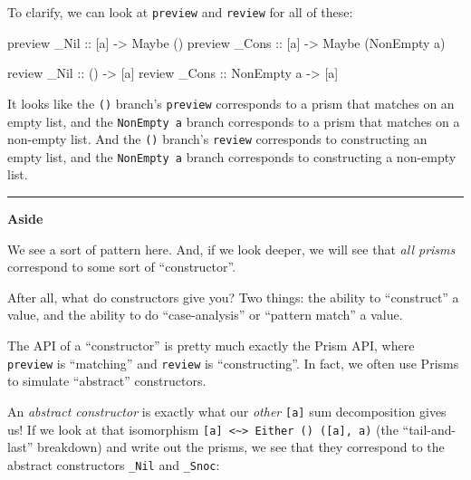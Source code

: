 \documentclass[]{article}
\newenvironment{Shaded}{}{}
\newcommand{\DataTypeTok}[1]{\textcolor[rgb]{0.56,0.13,0.00}{#1}}
\newcommand{\NormalTok}[1]{#1}
\newcommand{\OtherTok}[1]{\textcolor[rgb]{0.00,0.44,0.13}{#1}}
\begin{document}
To clarify, we can look at \texttt{preview} and \texttt{review} for all of
these:

\begin{Shaded}
\begin{Highlighting}[]
\NormalTok{preview}\OtherTok{ \_Nil  ::}\NormalTok{ [a] }\OtherTok{{-}\textgreater{}} \DataTypeTok{Maybe}\NormalTok{ ()}
\NormalTok{preview}\OtherTok{ \_Cons ::}\NormalTok{ [a] }\OtherTok{{-}\textgreater{}} \DataTypeTok{Maybe}\NormalTok{ (}\DataTypeTok{NonEmpty}\NormalTok{ a)}

\NormalTok{review}\OtherTok{  \_Nil  ::}\NormalTok{ ()         }\OtherTok{{-}\textgreater{}}\NormalTok{ [a]}
\NormalTok{review}\OtherTok{  \_Cons ::} \DataTypeTok{NonEmpty}\NormalTok{ a }\OtherTok{{-}\textgreater{}}\NormalTok{ [a]}
\end{Highlighting}
\end{Shaded}

It looks like the \texttt{()} branch's \texttt{preview} corresponds to a prism
that matches on an empty list, and the \texttt{NonEmpty\ a} branch corresponds
to a prism that matches on a non-empty list. And the \texttt{()} branch's
\texttt{review} corresponds to constructing an empty list, and the
\texttt{NonEmpty\ a} branch corresponds to constructing a non-empty list.

\begin{center}\rule{0.5\linewidth}{0.5pt}\end{center}

\textbf{Aside}

We see a sort of pattern here. And, if we look deeper, we will see that
\emph{all prisms} correspond to some sort of ``constructor''.

After all, what do constructors give you? Two things: the ability to
``construct'' a value, and the ability to do ``case-analysis'' or ``pattern
match'' a value.

The API of a ``constructor'' is pretty much exactly the Prism API, where
\texttt{preview} is ``matching'' and \texttt{review} is ``constructing''. In
fact, we often use Prisms to simulate ``abstract'' constructors.

An \emph{abstract constructor} is exactly what our \emph{other} \texttt{{[}a{]}}
sum decomposition gives us! If we look at that isomorphism
\texttt{{[}a{]}\ \textless{}\textasciitilde{}\textgreater{}\ Either\ ()\ ({[}a{]},\ a)}
(the ``tail-and-last'' breakdown) and write out the prisms, we see that they
correspond to the abstract constructors \texttt{\_Nil} and \texttt{\_Snoc}:
\end{document}

